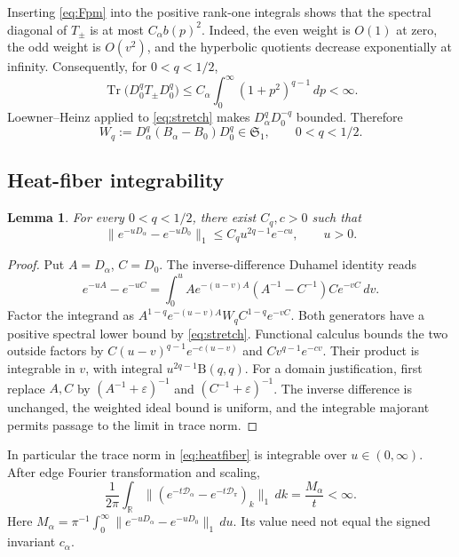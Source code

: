 \documentclass[11pt]{amsart}
\numberwithin{equation}{section}
\newtheorem{lemma}[theorem]{Lemma}
\theoremstyle{remark}
\newcommand{\R}{\mathbb{R}}
\newcommand{\Tr}{\operatorname{Tr}}
\newcommand{\Sone}{\mathfrak{S}_1}
\newcommand{\Dcal}{\mathcal{D}}
\begin{document}
Inserting \eqref{eq:Fpm} into the positive rank-one integrals shows that the spectral diagonal of $T_\pm$ is at most $C_\alpha b(p)^2$. Indeed, the even weight is $O(1)$ at zero, the odd weight is $O(v^2)$, and the hyperbolic quotients decrease exponentially at infinity. Consequently, for $0<q<1/2$,
\begin{equation}\label{eq:weighted}
\Tr\big(D_0^qT_\pm D_0^q\big)\le C_\alpha\int_0^\infty(1+p^2)^{q-1}\,dp<\infty .
\end{equation}
Loewner--Heinz applied to \eqref{eq:stretch} makes $D_\alpha^qD_0^{-q}$ bounded. Therefore
\begin{equation}\label{eq:Wq}
W_q:=D_\alpha^q(B_\alpha-B_0)D_0^q\in\Sone,\qquad 0<q<1/2 .
\end{equation}

\subsection{Heat-fiber integrability}
\begin{lemma}\label{lem:heatfiber}
For every $0<q<1/2$, there exist $C_q,c>0$ such that
\begin{equation}\label{eq:heatfiber}
\|e^{-uD_\alpha}-e^{-uD_0}\|_1\le C_qu^{2q-1}e^{-cu},\qquad u>0 .
\end{equation}
\end{lemma}

\begin{proof}
Put $A=D_\alpha$, $C=D_0$. The inverse-difference Duhamel identity reads
\begin{equation}\label{eq:duhamelinv}
e^{-uA}-e^{-uC}=\int_0^uAe^{-(u-v)A}(A^{-1}-C^{-1})Ce^{-vC}\,dv .
\end{equation}
Factor the integrand as $A^{1-q}e^{-(u-v)A}W_qC^{1-q}e^{-vC}$. Both generators have a positive spectral lower bound by \eqref{eq:stretch}. Functional calculus bounds the two outside factors by $C(u-v)^{q-1}e^{-c(u-v)}$ and $Cv^{q-1}e^{-cv}$. Their product is integrable in $v$, with integral $u^{2q-1}\mathrm{B}(q,q)$. For a domain justification, first replace $A,C$ by $(A^{-1}+\varepsilon)^{-1}$ and $(C^{-1}+\varepsilon)^{-1}$. The inverse difference is unchanged, the weighted ideal bound is uniform, and the integrable majorant permits passage to the limit in trace norm.
\end{proof}

In particular the trace norm in \eqref{eq:heatfiber} is integrable over $u\in(0,\infty)$. After edge Fourier transformation and scaling,
\begin{equation}\label{eq:Malpha}
\frac1{2\pi}\int_\R\|(e^{-t\Dcal_\alpha}-e^{-t\Dcal_\pi})_k\|_1\,dk=\frac{M_\alpha}{t}<\infty .
\end{equation}
Here $M_\alpha=\pi^{-1}\int_0^\infty\|e^{-uD_\alpha}-e^{-uD_0}\|_1\,du$. Its value need not equal the signed invariant $c_\alpha$.
\end{document}
